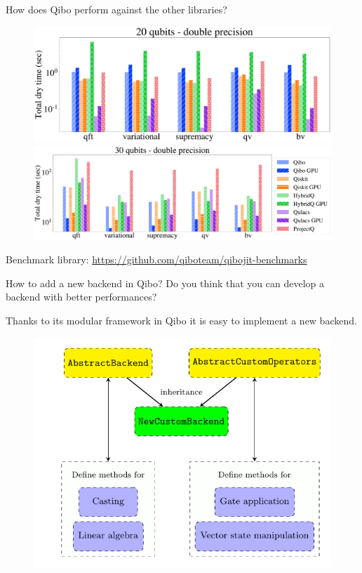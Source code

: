 \documentclass[11p,aspectratio=169]{beamer}
\begin{document}
\begin{frame}{How does Qibo perform against the other libraries?}
    \begin{figure}
        \centering
        \includegraphics[height=0.4\textheight]{figures/libraries_double_20qubits_total_dry_time.pdf}
        \includegraphics[height=0.31\textheight]{figures/libraries_double_30qubits_total_dry_time.pdf}
    \end{figure}
    Benchmark library: \url{https://github.com/qiboteam/qibojit-benchmarks}
    
\end{frame}

\begin{frame}{How to add a new backend in Qibo?}
    Do you think that you can develop a backend with better performances?

    Thanks to its modular framework in Qibo it is easy to implement a new backend.

    \begin{figure}
        \includegraphics{figures/backend_implementation.pdf}
    \end{figure}


\end{frame}
\end{document}
